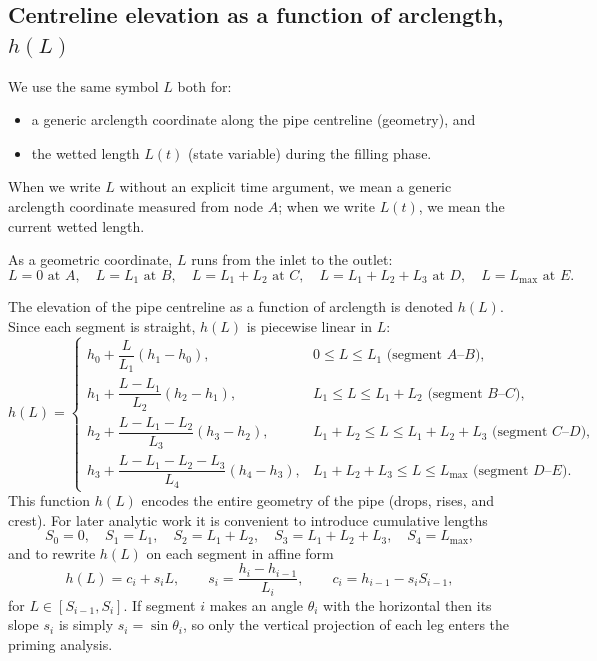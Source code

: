\documentclass[11pt]{article}
\begin{document}
\subsection{Centreline elevation as a function of arclength, $h(L)$}

We use the same symbol $L$ both for:
\begin{itemize}
  \item a generic arclength coordinate along the pipe centreline (geometry), and
  \item the wetted length $L(t)$ (state variable) during the filling phase.
\end{itemize}
When we write $L$ without an explicit time argument, we mean a generic arclength coordinate
measured from node $A$; when we write $L(t)$, we mean the current wetted length.

As a geometric coordinate, $L$ runs from the inlet to the outlet:
\[
  L = 0 \text{ at } A,\quad
  L = L_1 \text{ at } B,\quad
  L = L_1 + L_2 \text{ at } C,\quad
  L = L_1 + L_2 + L_3 \text{ at } D,\quad
  L = L_{\max} \text{ at } E.
\]

The elevation of the pipe centreline as a function of arclength is denoted $h(L)$. Since
each segment is straight, $h(L)$ is piecewise linear in $L$:
\[
h(L) = \begin{cases}
  h_0 + \dfrac{L}{L_1}(h_1 - h_0), & 0 \le L \le L_1 \text{ (segment $A$--$B$)}, \\[1em]
  h_1 + \dfrac{L - L_1}{L_2}(h_2 - h_1), & L_1 \le L \le L_1 + L_2 \text{ (segment $B$--$C$)}, \\[1em]
  h_2 + \dfrac{L - L_1 - L_2}{L_3}(h_3 - h_2), & L_1 + L_2 \le L \le L_1 + L_2 + L_3 \text{ (segment $C$--$D$)}, \\[1em]
  h_3 + \dfrac{L - L_1 - L_2 - L_3}{L_4}(h_4 - h_3), & L_1 + L_2 + L_3 \le L \le L_{\max} \text{ (segment $D$--$E$)}.
\end{cases}
\]
This function $h(L)$ encodes the entire geometry of the pipe (drops, rises, and crest).
For later analytic work it is convenient to introduce cumulative lengths
\[
  S_0 = 0,\quad S_1 = L_1,\quad S_2 = L_1 + L_2,\quad S_3 = L_1 + L_2 + L_3,\quad S_4 = L_{\max},
\]
and to rewrite $h(L)$ on each segment in affine form
\begin{equation}
  h(L) = c_i + s_i L,\qquad
  s_i = \frac{h_i - h_{i-1}}{L_i},\qquad
  c_i = h_{i-1} - s_i S_{i-1},
  \label{eq:linear-hi}
\end{equation}
for $L\in [S_{i-1},S_i]$. If segment $i$ makes an angle $\theta_i$ with the horizontal then
its slope $s_i$ is simply $s_i = \sin\theta_i$, so only the vertical projection of each leg
enters the priming analysis.
\end{document}

